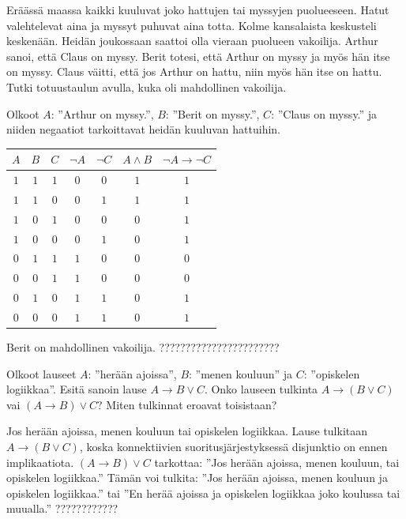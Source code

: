 \begin{tehtava}
     Eräässä maassa kaikki kuuluvat joko hattujen tai myssyjen puolueeseen. Hatut valehtelevat aina ja myssyt puhuvat aina totta. Kolme kansalaista keskusteli keskenään. Heidän joukossaan saattoi olla vieraan puolueen vakoilija. Arthur sanoi, että Claus on myssy. Berit totesi, että Arthur on myssy ja myös hän itse on myssy. Claus väitti, että jos Arthur on hattu, niin myös hän itse on hattu. Tutki totuustaulun avulla, kuka oli mahdollinen vakoilija.
     \begin{vastaus} \newline
    Olkoot $A$: ''Arthur on myssy.'', $B$: ''Berit on myssy.'', $C$: ''Claus on myssy.'' ja niiden negaatiot tarkoittavat heidän kuuluvan hattuihin.
        \begin{center}
		    \begin{tabular}{|c|c|c|c|c|c|c|}\hline
		    $A$ & $B$ & $C$ & $\lnot A$ & $\lnot C$ & $A\land B$ & $\lnot A\to \lnot C$ \\ \hline
		    $1$ & $1$ & $1$ & $0$ & $0$ & $1$ & $1$ \\ %
		    $1$ & $1$ & $0$ & $0$ & $1$ & $1$ & $1$ \\
		    $1$ & $0$ & $1$ & $0$ & $0$ & $0$ & $1$ \\
		    $1$ & $0$ & $0$ & $0$ & $1$ & $0$ & $1$ \\
		    $0$ & $1$ & $1$ & $1$ & $0$ & $0$ & $0$ \\
		    $0$ & $0$ & $1$ & $1$ & $0$ & $0$ & $0$ \\
		    $0$ & $1$ & $0$ & $1$ & $1$ & $0$ & $1$ \\
		    $0$ & $0$ & $0$ & $1$ & $1$ & $0$ & $1$ \\ \hline
\end{tabular}
\end{center}
		Berit on mahdollinen vakoilija. ??????????????????????? %
    \end{vastaus}
    
\end{tehtava}

\begin{tehtava}
     Olkoot lauseet $A$: ''herään ajoissa'', $B$: ''menen kouluun'' ja $C$: ''opiskelen logiikkaa''.
     Esitä sanoin lause $A \to B \lor C$. Onko lauseen tulkinta $A \to (B \lor C)$ vai $(A \to B) \lor C$? Miten tulkinnat eroavat toisistaan? 
        \begin{vastaus} \newline
	 Jos herään ajoissa, menen kouluun tai opiskelen logiikkaa. Lause tulkitaan $A\to (B\lor C)$, koska konnektiivien suoritusjärjestyksessä disjunktio on ennen implikaatiota. $(A\to B)\lor C$ tarkottaa: ''Jos herään ajoissa, menen kouluun, tai opiskelen logiikkaa.'' Tämän voi tulkita: ''Jos herään ajoissa, menen kouluun ja opiskelen logiikkaa.'' tai ''En herää ajoissa ja opiskelen logiikkaa joko koulussa tai muualla.'' ???????????? 
    \end{vastaus}
    
\end{tehtava}

